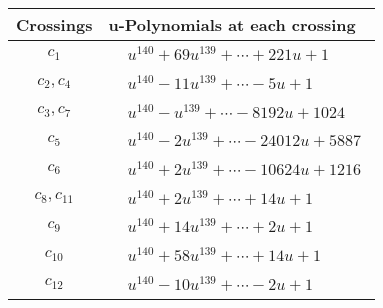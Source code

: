 \documentclass[1p]{elsarticle_modified}
\theoremstyle{definition}
\begin{document}
\begin{tabular}{m{50pt}|m{274pt}}
Crossings & \hspace{64pt}u-Polynomials at each crossing \\
\hline $$\begin{aligned}c_{1}\end{aligned}$$&$\begin{aligned}
&u^{140}+69 u^{139}+\cdots+221 u+1
\end{aligned}$\\
\hline $$\begin{aligned}c_{2},c_{4}\end{aligned}$$&$\begin{aligned}
&u^{140}-11 u^{139}+\cdots-5 u+1
\end{aligned}$\\
\hline $$\begin{aligned}c_{3},c_{7}\end{aligned}$$&$\begin{aligned}
&u^{140}- u^{139}+\cdots-8192 u+1024
\end{aligned}$\\
\hline $$\begin{aligned}c_{5}\end{aligned}$$&$\begin{aligned}
&u^{140}-2 u^{139}+\cdots-24012 u+5887
\end{aligned}$\\
\hline $$\begin{aligned}c_{6}\end{aligned}$$&$\begin{aligned}
&u^{140}+2 u^{139}+\cdots-10624 u+1216
\end{aligned}$\\
\hline $$\begin{aligned}c_{8},c_{11}\end{aligned}$$&$\begin{aligned}
&u^{140}+2 u^{139}+\cdots+14 u+1
\end{aligned}$\\
\hline $$\begin{aligned}c_{9}\end{aligned}$$&$\begin{aligned}
&u^{140}+14 u^{139}+\cdots+2 u+1
\end{aligned}$\\
\hline $$\begin{aligned}c_{10}\end{aligned}$$&$\begin{aligned}
&u^{140}+58 u^{139}+\cdots+14 u+1
\end{aligned}$\\
\hline $$\begin{aligned}c_{12}\end{aligned}$$&$\begin{aligned}
&u^{140}-10 u^{139}+\cdots-2 u+1
\end{aligned}$\\
\hline
\end{tabular}\\~\\
\end{document}
